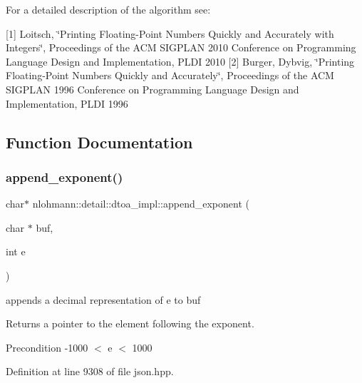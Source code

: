 For a detailed description of the algorithm see\+:

\mbox{[}1\mbox{]} Loitsch, \char`\"{}\+Printing Floating-\/\+Point Numbers Quickly and Accurately with
    Integers\char`\"{}, Proceedings of the A\+CM S\+I\+G\+P\+L\+AN 2010 Conference on Programming Language Design and Implementation, P\+L\+DI 2010 \mbox{[}2\mbox{]} Burger, Dybvig, \char`\"{}\+Printing Floating-\/\+Point Numbers Quickly and Accurately\char`\"{}, Proceedings of the A\+CM S\+I\+G\+P\+L\+AN 1996 Conference on Programming Language Design and Implementation, P\+L\+DI 1996 

\subsection{Function Documentation}
\mbox{\label{namespacenlohmann_1_1detail_1_1dtoa__impl_a84733638b826eda624488f5fa4521e0b}} 
\subsubsection{\texorpdfstring{append\+\_\+exponent()}{append\_exponent()}}
{\footnotesize\ttfamily char$\ast$ nlohmann\+::detail\+::dtoa\+\_\+impl\+::append\+\_\+exponent (\begin{DoxyParamCaption}\item[{char $\ast$}]{buf,  }\item[{int}]{e }\end{DoxyParamCaption})\hspace{0.3cm}{\ttfamily [inline]}}



appends a decimal representation of e to buf 

\begin{DoxyReturn}{Returns}
a pointer to the element following the exponent. 
\end{DoxyReturn}
\begin{DoxyPrecond}{Precondition}
-\/1000 $<$ e $<$ 1000 
\end{DoxyPrecond}


Definition at line 9308 of file json.\+hpp.

\mbox{\label{namespacenlohmann_1_1detail_1_1dtoa__impl_a22b6e37654ac93c6d0d9c06ec1bf5ded}} 
